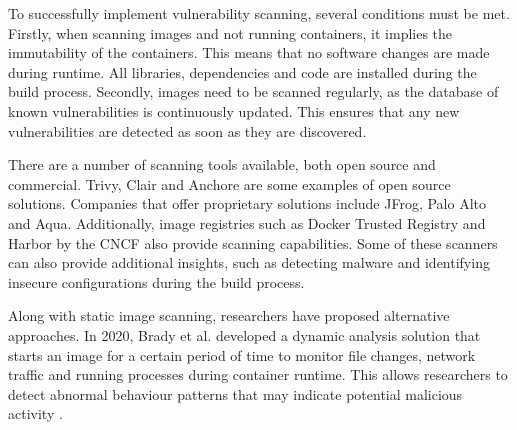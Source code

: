 To successfully implement vulnerability scanning, several conditions must be met. Firstly, when scanning images and not running containers, it implies the immutability of the containers. This means that no software changes are made during runtime. All libraries, dependencies and code are installed during the build process. Secondly, images need to be scanned regularly, as the database of known vulnerabilities is continuously updated. This ensures that any new vulnerabilities are detected as soon as they are discovered.

There are a number of scanning tools available, both open source and commercial. Trivy, Clair and Anchore are some examples of open source solutions. Companies that offer proprietary solutions include JFrog, Palo Alto and Aqua. Additionally, image registries such as Docker Trusted Registry and Harbor by the CNCF also provide scanning capabilities. Some of these scanners can also provide additional insights, such as detecting malware and identifying insecure configurations during the build process.

Along with static image scanning, researchers have proposed alternative approaches. In 2020, Brady et al. developed a dynamic analysis solution that starts an image for a certain period of time to monitor file changes, network traffic and running processes during container runtime. This allows researchers to detect abnormal behaviour patterns that may indicate potential malicious activity \cite{c:15}.
